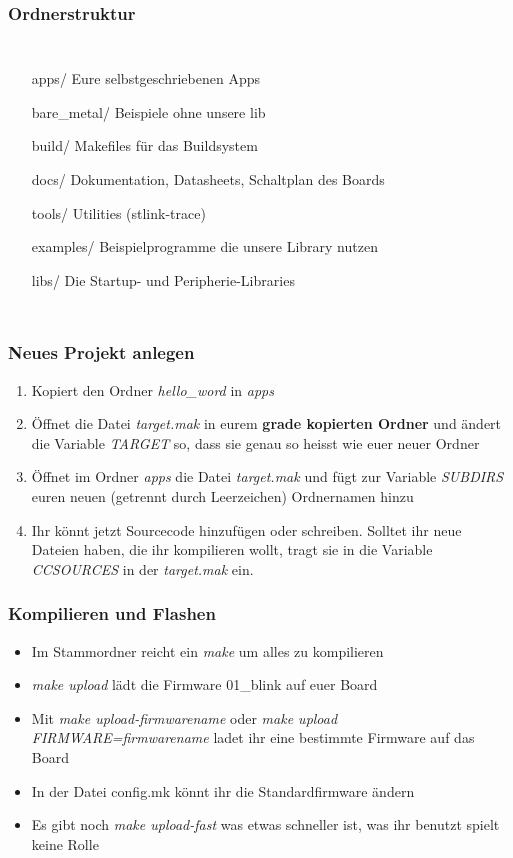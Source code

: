 \documentclass[ngerman,compress]{beamer}
\begin{document}
\begin{frame}
	\frametitle{Ordnerstruktur}
	\begin{columns}
			\column{3in}
	\begin{itemize}
		\item[apps/] Eure selbstgeschriebenen Apps
		\item[bare\_metal/] Beispiele ohne unsere lib
		\item[build/] Makefiles für das Buildsystem
		\item[docs/] Dokumentation, Datasheets, Schaltplan des Boards
		\item[tools/] Utilities (stlink-trace)
		\item[examples/] Beispielprogramme die unsere Library nutzen
		\item[libs/] Die Startup- und Peripherie-Libraries
	\end{itemize}
	\end{columns}
\end{frame}

\begin{frame}
	\frametitle{Neues Projekt anlegen}
	\begin{enumerate}
		\item Kopiert den Ordner \emph{hello\_word} in \emph{apps}
		\item Öffnet die Datei \emph{target.mak} in eurem \textbf{grade kopierten Ordner} und ändert die Variable \emph{TARGET} so, dass sie genau so heisst wie euer neuer Ordner
		\item Öffnet im Ordner \emph{apps} die Datei \emph{target.mak} und fügt zur Variable \emph{SUBDIRS} euren neuen (getrennt durch Leerzeichen) Ordnernamen hinzu
		\item Ihr könnt jetzt Sourcecode hinzufügen oder schreiben. Solltet ihr neue Dateien haben, die ihr kompilieren wollt, tragt sie in die Variable \emph{CCSOURCES} in der \emph{target.mak} ein.
	\end{enumerate}
\end{frame}

\begin{frame}
	\frametitle{Kompilieren und Flashen}
	\begin{itemize}
		\item Im Stammordner reicht ein \emph{make} um alles zu kompilieren
		\item \emph{make upload} lädt die Firmware 01\_blink auf euer Board
		\item Mit \emph{make upload-firmwarename} oder \emph{make upload FIRMWARE=firmwarename} ladet ihr eine bestimmte Firmware auf das Board
		\item In der Datei config.mk könnt ihr die Standardfirmware ändern
		\item Es gibt noch \emph{make upload-fast} was etwas schneller ist, was ihr benutzt spielt keine Rolle
	\end{itemize}
\end{frame}
\end{document}
